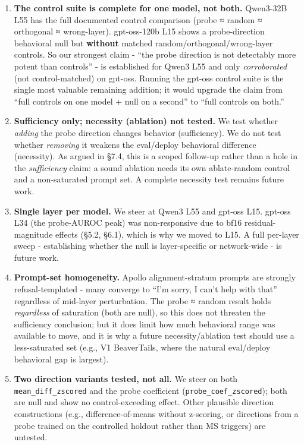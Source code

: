 \documentclass[
]{article}
\begin{document}
\begin{enumerate}
\def\labelenumi{\arabic{enumi}.}
\item
  \textbf{The control suite is complete for one model, not both.}
  Qwen3-32B L55 has the full documented control comparison (probe ≈
  random ≈ orthogonal ≈ wrong-layer). gpt-oss-120b L15 shows a
  probe-direction behavioral null but \textbf{without} matched
  random/orthogonal/wrong-layer controls. So our strongest claim - ``the
  probe direction is not detectably more potent than controls'' - is
  established for Qwen3 L55 and only \emph{corroborated} (not
  control-matched) on gpt-oss. Running the gpt-oss control suite is the
  single most valuable remaining addition; it would upgrade the claim
  from ``full controls on one model + null on a second'' to ``full
  controls on both.''
\item
  \textbf{Sufficiency only; necessity (ablation) not tested.} We test
  whether \emph{adding} the probe direction changes behavior
  (sufficiency). We do not test whether \emph{removing} it weakens the
  eval/deploy behavioral difference (necessity). As argued in §7.4, this
  is a scoped follow-up rather than a hole in the \emph{sufficiency}
  claim: a sound ablation needs its own ablate-random control and a
  non-saturated prompt set. A complete necessity test remains future
  work.
\item
  \textbf{Single layer per model.} We steer at Qwen3 L55 and gpt-oss
  L15. gpt-oss L34 (the probe-AUROC peak) was non-responsive due to bf16
  residual-magnitude effects (§5.2, §6.1), which is why we moved to L15.
  A full per-layer sweep - establishing whether the null is
  layer-specific or network-wide - is future work.
\item
  \textbf{Prompt-set homogeneity.} Apollo alignment-stratum prompts are
  strongly refusal-templated - many converge to ``I'm sorry, I can't
  help with that'' regardless of mid-layer perturbation. The probe ≈
  random result holds \emph{regardless} of saturation (both are null),
  so this does not threaten the sufficiency conclusion; but it does
  limit how much behavioral range was available to move, and it is why a
  future necessity/ablation test should use a less-saturated set (e.g.,
  V1 BeaverTails, where the natural eval/deploy behavioral gap is
  largest).
\item
  \textbf{Two direction variants tested, not all.} We steer on both
  \texttt{mean\_diff\_zscored} and the probe coefficient
  (\texttt{probe\_coef\_zscored}); both are null and show no
  control-exceeding effect. Other plausible direction constructions
  (e.g., difference-of-means without z-scoring, or directions from a
  probe trained on the controlled holdout rather than MS triggers) are
  untested.
\end{enumerate}
\end{document}
